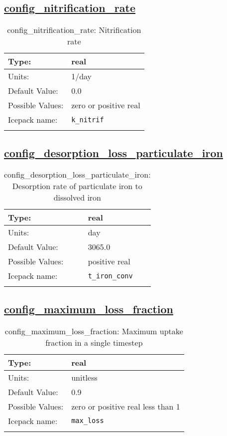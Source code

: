 \subsection[config\_nitrification\_rate]{\hyperref[sec:nm_tab_biogeochemistry]{config\_nitrification\_rate}}
\label{subsec:nm_sec_config_nitrification_rate}
\begin{center}
\begin{longtable}{| p{2.0in} || p{4.0in} |}
    \hline
    Type: & real \\
    \hline
    Units: & \si{1/day} \\
    \hline
    Default Value: & 0.0 \\
    \hline
    Possible Values: & zero or positive real \\
    \hline
    \hline
    Icepack name: & \verb+k_nitrif+ \\
    \caption{config\_nitrification\_rate: Nitrification rate}
\end{longtable}
\end{center}
\subsection[config\_desorption\_loss\_particulate\_iron]{\hyperref[sec:nm_tab_biogeochemistry]{config\_desorption\_loss\_particulate\_iron}}
\label{subsec:nm_sec_config_desorption_loss_particulate_iron}
\begin{center}
\begin{longtable}{| p{2.0in} || p{4.0in} |}
    \hline
    Type: & real \\
    \hline
    Units: & \si{day} \\
    \hline
    Default Value: & 3065.0 \\
    \hline
    Possible Values: & positive real \\
    \hline
    \hline
    Icepack name: & \verb+t_iron_conv+ \\
    \caption{config\_desorption\_loss\_particulate\_iron: Desorption rate of particulate iron to dissolved iron}
\end{longtable}
\end{center}
\subsection[config\_maximum\_loss\_fraction]{\hyperref[sec:nm_tab_biogeochemistry]{config\_maximum\_loss\_fraction}}
\label{subsec:nm_sec_config_maximum_loss_fraction}
\begin{center}
\begin{longtable}{| p{2.0in} || p{4.0in} |}
    \hline
    Type: & real \\
    \hline
    Units: & \si{unitless} \\
    \hline
    Default Value: & 0.9 \\
    \hline
    Possible Values: & zero or positive real less than 1 \\
    \hline
    \hline
    Icepack name: & \verb+max_loss+ \\
    \caption{config\_maximum\_loss\_fraction: Maximum uptake fraction in a single timestep}
\end{longtable}
\end{center}
